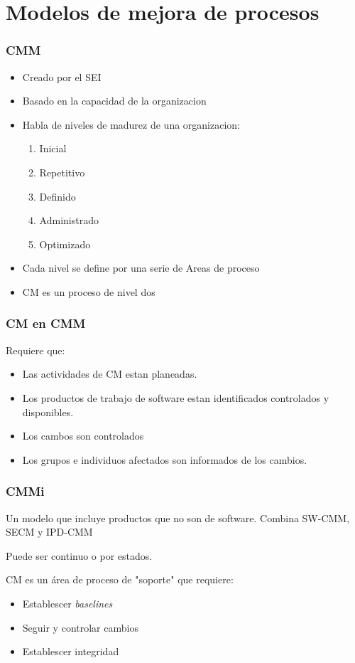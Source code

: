 \section{Modelos de mejora de procesos}
\begin{frame}
	\frametitle{CMM}
	\begin{itemize}
		\item Creado por el SEI
		\item Basado en la capacidad de la organizacion
		\item Habla de niveles de madurez de una organizacion:
			\begin{enumerate}
				\item Inicial
				\item Repetitivo
				\item Definido
				\item Administrado
				\item Optimizado
			\end{enumerate}
		\item Cada nivel se define por una serie de Areas de proceso
		\item CM es un proceso de nivel dos
	\end{itemize}
\end{frame}
\begin{frame}
	\frametitle{CM en CMM}
	Requiere que:
	\begin{itemize}
		\item Las actividades de CM estan planeadas.
		\item Los productos de trabajo de software estan identificados 
			controlados y disponibles.
		\item Los cambos son controlados
		\item Los grupos e individuos afectados son informados de 
			los cambios. 
	\end{itemize}
\end{frame}
\begin{frame}
	\frametitle{CMMi}
	Un modelo que incluye productos que no son de software. Combina SW-CMM, 
	SECM y IPD-CMM

	Puede ser continuo o por estados. 

	CM es un \'area de proceso de "soporte" que requiere:
	\begin{itemize}
		\item Establescer \emph{baselines}
		\item Seguir y controlar cambios
		\item Establescer integridad
	\end{itemize}


\end{frame}

